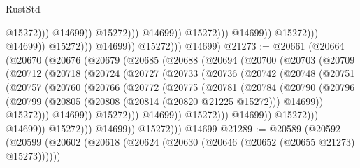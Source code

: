 \begin{lexlean}{RustStd}
\begin{coremodule}
                                                              @15272)))
                                                        @14699))
                                                    @15272)))
                                              @14699))
                                          @15272)))
                                    @14699))
                                @15272)))
                          @14699))
                      @15272)))
                @14699))
            @15272)))
      @14699)
@21273 := @20661
    (@20664
      (@20670
        (@20676
          (@20679
            (@20685
              (@20688
                (@20694
                  (@20700
                    (@20703
                      (@20709
                        (@20712
                          (@20718
                            (@20724
                              (@20727
                                (@20733
                                  (@20736
                                    (@20742
                                      (@20748
                                        (@20751
                                          (@20757
                                            (@20760
                                              (@20766
                                                (@20772
                                                  (@20775
                                                    (@20781
                                                      (@20784
                                                        (@20790
                                                          (@20796
                                                            (@20799
                                                              (@20805
                                                                (@20808
                                                                  (@20814 (@20820 @21225 @15272)))
                                                                @14699))
                                                            @15272)))
                                                      @14699))
                                                  @15272)))
                                            @14699))
                                        @15272)))
                                  @14699))
                              @15272)))
                        @14699))
                    @15272)))
              @14699))
          @15272)))
    @14699
@21289 := @20589
    (@20592
      (@20599
        (@20602 (@20618 (@20624 (@20630 (@20646 (@20652 (@20655 @21273) @15273))))))

\end{coremodule}
\end{lexlean}
